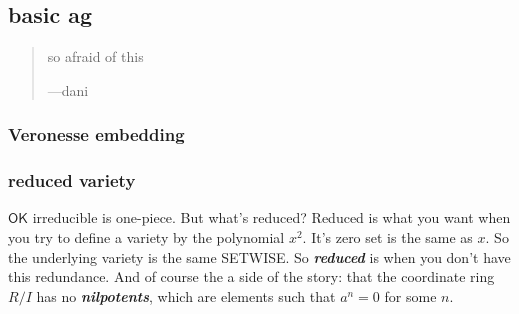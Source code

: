 \subsection{basic ag}
\vspace{1em}
\begin{quotation}
so afraid of this

\hfill ---dani
\end{quotation}
\vspace{2em}
\subsubsection{Veronesse embedding}



\subsubsection{reduced variety}
\(\mathsf{OK}\) irreducible is one-piece. But what's reduced? Reduced is what you want when you try to define a variety by the polynomial \(x^2\). It's zero set is the same as \(x\). So the underlying variety is the same SETWISE. So \textit{\textbf{reduced}} is when you don't have this redundance. And of course the a side of the story: that the coordinate ring  \(R/I\) has no \textit{\textbf{nilpotents}}, which are elements such that \(a^n=0\) for some \(n\).



